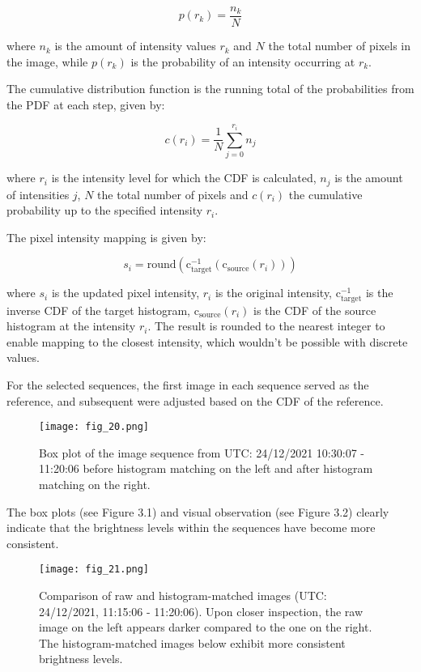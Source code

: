 \begin{equation}
p(r_k) = \frac{n_k}{N}
\end{equation}

where \( n_k\) is the amount of intensity values \( r_k \) and \(N\) the total number of pixels in the image, while \( p(r_k)\) is the probability of an intensity occurring at \( r_k \).

The cumulative distribution function is the running total of the probabilities from the PDF at each step, given by\cite{Gonzalez2018}: 

\begin{equation}
c(r_i) = \frac{1}{N} \sum_{j=0}^{r_i} n_j
\end{equation}

where \( r_i\) is the intensity level for which the CDF is calculated, \( n_j\) is the amount of intensities \( j\), \(N\) the total number of pixels and \(c(r_i)\) the cumulative probability up to the specified intensity \( r_i\). 

The pixel intensity mapping is given by\cite{Gonzalez2018}: 

\begin{equation}
s_i = \text{round} \left( \text{c}_{\text{target}}^{-1} \left( \text{c}_{\text{source}}(r_i) \right) \right)
\end{equation}

where \( s_i\) is the updated pixel intensity, \( r_i\) is the original intensity, \(\text{c}_{\text{target}}^{-1}\) is the inverse CDF of the target histogram, \(\text{c}_{\text{source}}(r_i)\) is the CDF of the source histogram at the intensity \( r_i\). The result is rounded to the nearest integer to enable mapping to the closest intensity, which wouldn't be possible with discrete values.  

For the selected sequences, the first image in each sequence served as the reference, and subsequent were adjusted based on the CDF of the reference. 
\FloatBarrier
\begin{figure}[h!] 
    \centering
    \texttt{[image: fig\_20.png]}
    \caption{Box plot of the image sequence from UTC: 24/12/2021 10:30:07 - 11:20:06 before histogram matching on the left and after histogram matching on the right.}
\end{figure}
\FloatBarrier
The box plots (see Figure 3.1) and visual observation (see Figure 3.2) clearly indicate that the brightness levels within the sequences have become more consistent. 
\FloatBarrier
\begin{figure}[h!] 
    \centering
    \texttt{[image: fig\_21.png]}
    \caption{Comparison of raw and histogram-matched images (UTC: 24/12/2021, 11:15:06 - 11:20:06). Upon closer inspection, the raw image on the left appears darker compared to the one on the right. The histogram-matched images below exhibit more consistent brightness levels.}
\end{figure}
\FloatBarrier

